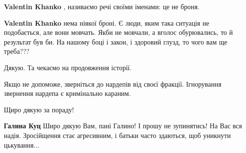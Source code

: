 \begin{itemize}
\begin{itemize}
\textbf{Valentin Khanko} , називаємо речі своїми іменами: це не броня.

 
\textbf{Valentin Khanko} нема ніякої броні. Є люди, яким така ситуація не подобається, але вони мовчать. Якби не мовчали, а вголос обурювались, то й результат був би. На нашому боці і закон, і здоровий глузд, то чого вам ще треба???
\end{itemize}

 
Дякую. Та чекаємо на продовження історії.

 

Якщо не допоможе, зверніться до нардепів від своєї фракції. Ігнорування звернення нардепа є кримінально караним.

\begin{itemize}
 
Щиро дякую за пораду!

 
\textbf{Галина Куц}
Широ дякую Вам, пані Галино!
І прошу не зупинятись! На Вас вся надія.
Зросійщення стає агресивним,
і батьки часто здаються, щоб уникнути цькування...
\end{itemize}

 


\end{itemize}
